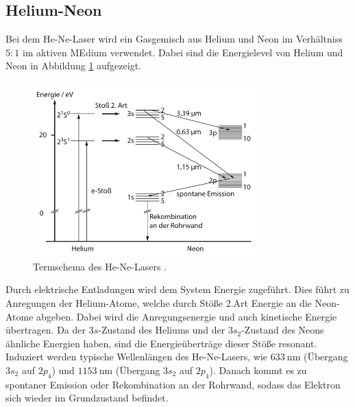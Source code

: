 \subsection{Helium-Neon}
Bei dem He-Ne-Laser wird ein Gasgemisch aus Helium und Neon im Verhältniss $5:1$ im aktiven MEdium verwendet.
Dabei sind die Energielevel von Helium und Neon in Abbildung \ref{pic:hene} aufgezeigt. 
\begin{figure}
    \centering
    \includegraphics[width = 0.78\textwidth]{pics/HE-Ne_Termshema.png}
    \caption{Termschema des He-Ne-Lasers \cite{Laser}.}
    \label{pic:hene}
\end{figure}
Durch elektrische Entladungen wird dem System Energie zugeführt.
Dies führt zu Anregungen der Helium-Atome, welche durch Stöße 2.Art Energie an die Neon-Atome abgeben.
Dabei wird die Anregungsenergie und auch kinetische Energie übertragen.
Da der $3s$-Zustand des Heliums und der $3s_2$-Zustand des Neons ähnliche Energien haben, sind die Energieüberträge dieser Stöße resonant.
Induziert werden typische Wellenlängen des He-Ne-Lasers, wie $\SI{633}{\nano\meter}$ (Übergang $3s_2$ auf $2p_4$) und $\SI{1153}{\nano\meter}$ (Übergang $3s_2$ auf $2p_4$).
Danach kommt es zu spontaner Emission oder Rekombination an der Rohrwand, sodass das Elektron sich wieder im Grundzustand befindet.

